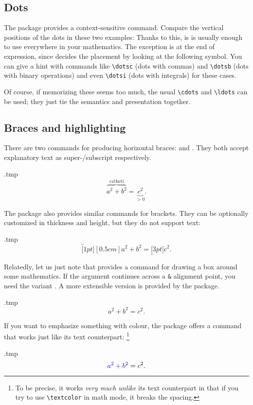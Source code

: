 %
%
\subsection{Dots}

The  package provides a context-sensitive  command.
Compare the vertical positions of the dots in these two examples:
%
Thanks to this, is is usually enough to use  everywhere in your mathematics.
The exception is at the end of expression,
since  decides the placement by looking at the following symbol.
You can give a hint with commands like \verb|\dotsc| (dots with commas)
and \verb|\dotsb| (dots with binary operations)
and even \verb|\dotsi| (dots with integrals) for these cases.

Of course, if memorizing these seems too much, the usual \verb|\cdots| and \verb|\ldots| can be used;
they just tie the semantics and presentation together.


%
%
\subsection{Braces and highlighting}
There are two commands for producing horizontal braces:
 and .
They both accept explanatory text as super-/subscript respectively.
%
\begin{VerbatimOut}{\jobname.tmp}
\[
\overbrace{a^2 + b^2}^{\text{catheti}}
= \underbrace{c^2}_{> 0}.
\]
\end{VerbatimOut}
\ShowExample

The  package also provides similar commands for brackets.
They can be optionally customized in thickness and height,
but they do not support text:
%
\begin{VerbatimOut}{\jobname.tmp}
\[
\overbracket[1pt][0.5cm]{a^2 + b^2}
= \underbracket[3pt]{c^2}.
\]
\end{VerbatimOut}
\ShowExample

Relatedly, let us just note that  provides a  command
for drawing a box around some mathematics.
If the argument continues across a \verb|&| alignment point,
you need the  variant .
A more extensible version is provided by the  package.
%
\begin{VerbatimOut}{\jobname.tmp}
\[
\boxed{a^2 + b^2} = c^2.
\]
\end{VerbatimOut}
\ShowExample

If you want to emphasize something with colour,
the  package offers a  command that works
just like its text counterpart:%
\footnote{To be precise, it works \emph{very much unlike} its text counterpart in that
if you try to use \texttt{\textbackslash textcolor} in math mode, it breaks the spacing.}
%
\begin{VerbatimOut}{\jobname.tmp}
\[
\mathcolor{blue}{a^2 + b^2} = c^2.
\]
\end{VerbatimOut}
\ShowExample


